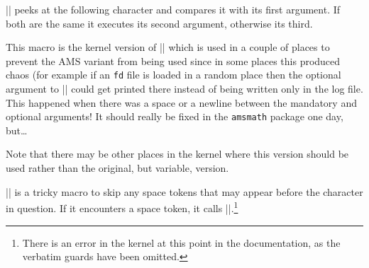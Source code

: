 \begin{macro}{\@ifnextchar}

  |\@ifnextchar| peeks at the following character and compares it
  with its first argument. If both are the same it executes its
  second argument, otherwise its third.
\begin{teX}
\long{}
\end{teX}
\end{macro}

\begin{macro}{}

    This macro is the kernel version of |\@ifnextchar| which is used
    in a couple of places to prevent the AMS variant from being used
    since in some places this produced chaos (for example
    if an \texttt{fd} file
    is loaded in a random place then the optional argument to
    |\ProvidesFile| could get printed there instead of being written
    only in the log file.  This happened
    when there was a space or a newline between the mandatory and
    optional arguments! It should really be fixed in the
    \texttt{amsmath} package one day, but\ldots

    Note that there may be other places in the kernel where this version
    should be used rather than the original, but variable, version.

\begin{teX}
\let\kernel@ifnextchar\@ifnextchar
\end{teX}
\end{macro}
%
%
\begin{macro}{\@ifnch}
    |\@ifnch| is a tricky macro to skip any space tokens that may
    appear before the character in question. If it encounters a space
    token, it calls |\@xifnch|.\footnote{There is an error in the kernel at this point in the documentation, as the
    verbatim guards have been omitted.}

\begin{teX}
\def\@ifnch{%
  \ifx\@let@token\@sptoken
    \let\reserved@c\@xifnch
  \else
    \ifx\@let@token\reserved@d
      \let\reserved@c\reserved@a
    \else
      \let\reserved@c\reserved@b
    \fi
  \fi
  \reserved@c}
\end{teX}
\end{macro}
%
